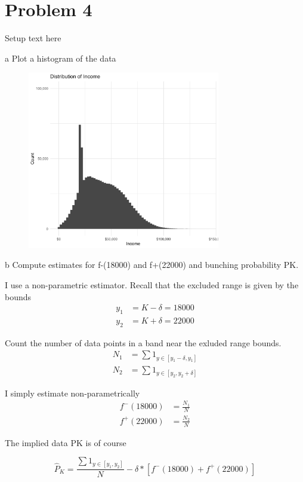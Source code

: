 \documentclass{article}
\begin{document}
\section*{Problem 4}
Setup text here

\begin{problem}{a}
Plot a histogram of the data
\end{problem}
\begin{solution}
\begin{figure}[!htb]
    \centering    
    \includegraphics[width=0.75\textwidth]{ps2/4a.png}
\end{figure}

\end{solution}

\begin{problem}{b}
Compute estimates for f-(18000) and f+(22000) and bunching probability PK.
\end{problem}
\begin{solution}
I use a non-parametric estimator. Recall that the excluded range is given by the bounds
\begin{align*}
    y_1 &= K - \delta = 18000 \\
    y_2 &= K + \delta = 22000
\end{align*}

Count the number of data points in a band near the exluded range bounds. 
\begin{align*}
    N_1 &= \sum 1_{y\in [y_1-\delta, y_1]} \\
    N_2 &= \sum 1_{y\in [y_2, y_2+\delta]}
\end{align*}

I simply estimate non-parametrically 
\begin{align*}
    f^-(18000) &= \frac{N_1}{N} \\
    f^+(22000) &= \frac{N_2}{N}
\end{align*}

The implied data PK is of course

$$
\widehat{P}_K = \frac{\sum 1_{y\in [y_1, y_2]}}{N} - \delta * [f^-(18000) + f^+(22000)]
$$
\end{solution}
\end{document}
